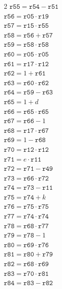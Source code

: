 \documentclass[10pt]{article}
\begin{document}
\begin{multicols}{2}
\(\mathtt{r55} = \mathtt{r54} - \mathtt{r51}\)\\
\(\mathtt{r56} = \mathtt{r05} \cdot \mathtt{r19}\)\\
\(\mathtt{r57} = \mathtt{r15} \cdot \mathtt{r55}\)\\
\(\mathtt{r58} = \mathtt{r56} + \mathtt{r57}\)\\
\(\mathtt{r59} = \mathtt{r58} \cdot \mathtt{r58}\)\\
\(\mathtt{r60} = \mathtt{r05} \cdot \mathtt{r05}\)\\
\(\mathtt{r61} = \mathtt{r17} \cdot \mathtt{r12}\)\\
\(\mathtt{r62} = 1 + \mathtt{r61}\)\\
\(\mathtt{r63} = \mathtt{r60} \cdot \mathtt{r62}\)\\
\(\mathtt{r64} = \mathtt{r59} - \mathtt{r63}\)\\
\(\mathtt{r65} = 1 + d\)\\
\(\mathtt{r66} = \mathtt{r65} \cdot \mathtt{r65}\)\\
\(\mathtt{r67} = \mathtt{r66} - 1\)\\
\(\mathtt{r68} = \mathtt{r17} \cdot \mathtt{r67}\)\\
\(\mathtt{r69} = 1 - \mathtt{r68}\)\\
\(\mathtt{r70} = \mathtt{r12} \cdot \mathtt{r12}\)\\
\(\mathtt{r71} = e \cdot \mathtt{r11}\)\\
\(\mathtt{r72} = \mathtt{r71} - \mathtt{r49}\)\\
\(\mathtt{r73} = \mathtt{r66} \cdot \mathtt{r72}\)\\
\(\mathtt{r74} = \mathtt{r73} - \mathtt{r11}\)\\
\(\mathtt{r75} = \mathtt{r74} + k\)\\
\(\mathtt{r76} = \mathtt{r75} \cdot \mathtt{r75}\)\\
\(\mathtt{r77} = \mathtt{r74} \cdot \mathtt{r74}\)\\
\(\mathtt{r78} = \mathtt{r68} \cdot \mathtt{r77}\)\\
\(\mathtt{r79} = \mathtt{r78} - 1\)\\
\(\mathtt{r80} = \mathtt{r69} \cdot \mathtt{r76}\)\\
\(\mathtt{r81} = \mathtt{r80} + \mathtt{r79}\)\\
\(\mathtt{r82} = \mathtt{r68} \cdot \mathtt{r69}\)\\
\(\mathtt{r83} = \mathtt{r70} \cdot \mathtt{r81}\)\\
\(\mathtt{r84} = \mathtt{r83} - \mathtt{r82}\)\\

\end{multicols}
\end{document}
